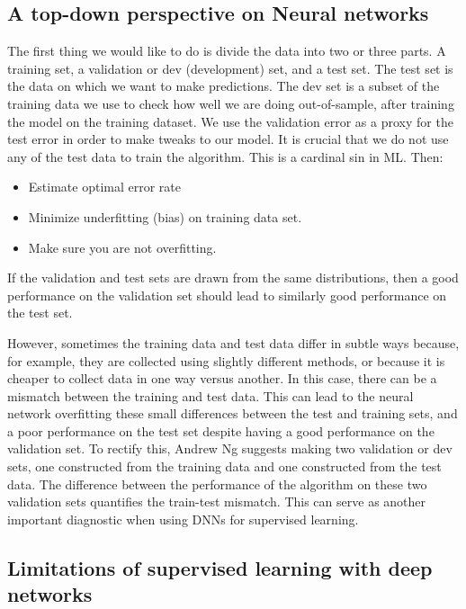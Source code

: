 \documentclass[%
oneside,                 %
final,                   %
10pt]{article}
\begin{document}
\subsection*{A top-down perspective on Neural networks}


The first thing we would like to do is divide the data into two or three
parts. A training set, a validation or dev (development) set, and a
test set. The test set is the data on which we want to make
predictions. The dev set is a subset of the training data we use to
check how well we are doing out-of-sample, after training the model on
the training dataset. We use the validation error as a proxy for the
test error in order to make tweaks to our model. It is crucial that we
do not use any of the test data to train the algorithm. This is a
cardinal sin in ML. Then:


\begin{itemize}
\item Estimate optimal error rate

\item Minimize underfitting (bias) on training data set.

\item Make sure you are not overfitting.
\end{itemize}

\noindent
If the validation and test sets are drawn from the same distributions,
then a good performance on the validation set should lead to similarly
good performance on the test set. 

However, sometimes
the training data and test data differ in subtle ways because, for
example, they are collected using slightly different methods, or
because it is cheaper to collect data in one way versus another. In
this case, there can be a mismatch between the training and test
data. This can lead to the neural network overfitting these small
differences between the test and training sets, and a poor performance
on the test set despite having a good performance on the validation
set. To rectify this, Andrew Ng suggests making two validation or dev
sets, one constructed from the training data and one constructed from
the test data. The difference between the performance of the algorithm
on these two validation sets quantifies the train-test mismatch. This
can serve as another important diagnostic when using DNNs for
supervised learning.

\subsection*{Limitations of supervised learning with deep networks}
\end{document}
